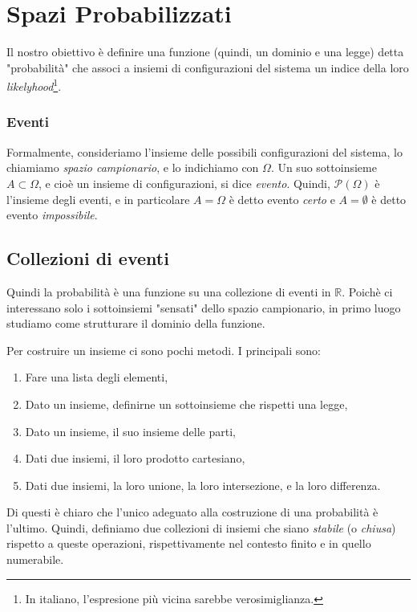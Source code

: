 \chapter{Spazi Probabilizzati}

Il nostro obiettivo è definire una funzione (quindi, un dominio e una legge) detta "probabilità" che associ a insiemi di configurazioni del sistema un indice della loro \textit{likelyhood}\footnote{In italiano, l'espresione più vicina sarebbe verosimiglianza.}.

\subsection*{Eventi}

Formalmente, consideriamo l'insieme delle possibili configurazioni del sistema, lo chiamiamo \textit{spazio campionario}, e lo indichiamo con $\Omega$. Un suo sottoinsieme $A\subset\Omega$, e cioè un insieme di configurazioni, si dice \textit{evento}. Quindi, $\mathcal{P}(\Omega)$ è l'insieme degli eventi, e in particolare $A=\Omega$ è detto evento \textit{certo} e $A=\emptyset$ è detto evento \textit{impossibile}. 

\section{Collezioni di eventi}

Quindi la probabilità è una funzione su una collezione di eventi in $\mathbb{R}$. Poichè ci interessano solo i sottoinsiemi "sensati" dello spazio campionario, in primo luogo studiamo come strutturare il dominio della funzione.

Per costruire un insieme ci sono pochi metodi. I principali sono:
\begin{enumerate}
	\item Fare una lista degli elementi,
	\item Dato un insieme, definirne un sottoinsieme che rispetti una legge,
	\item Dato un insieme, il suo insieme delle parti,
	\item Dati due insiemi, il loro prodotto cartesiano,
	\item Dati due insiemi, la loro unione, la loro intersezione, e la loro differenza.
\end{enumerate}
Di questi è chiaro che l'unico adeguato alla costruzione di una probabilità è l'ultimo. Quindi, definiamo due collezioni di insiemi che siano \textit{stabile} (o \textit{chiusa}) rispetto a queste operazioni, rispettivamente nel contesto finito e in quello numerabile.

